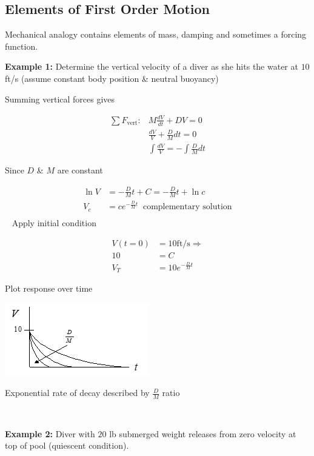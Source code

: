 \documentclass[
]{book}
\begin{document}
\hypertarget{elements-of-first-order-motion}{%
\subsection{Elements of First Order Motion}\label{elements-of-first-order-motion}}

Mechanical analogy contains elements of mass, damping and sometimes a forcing function.

\textbf{Example 1:} Determine the vertical velocity of a diver as she hits the water at \(10\) ft/s (assume constant body position \& neutral buoyancy)

Summing vertical forces gives

\[ 
\begin{align}
\sum F_{\mathrm{vert}} : &M \frac{dV}{dt} + DV = 0 \\
&\frac{dV}{V} + \frac{D}{M} dt = 0 \\
&\int{}{} \frac{dV}{V} = -\int{}{} \frac{D}{M} dt
\end{align}
\]

Since \(D\) \& \(M\) are constant

\[ 
\begin{align}
\ln V &= -\frac{D}{M} t + C =  -\frac{D}{M} t + \ln c\\
V_c &= c e^{-\frac{D}{M} t} \;\;\text{complementary solution}\\
\end{align}
\]
~
Apply initial condition

\[ 
\begin{align}
V(t=0) &= 10 \mathrm{ft/s} \Rightarrow \\
10 &= C \\
V_T &= 10 e^{-\frac{D}{M} t}
\end{align}
\]

Plot response over time

\includegraphics{media/08/image5.png}

Exponential rate of decay described by \(\frac{D}{M}\) ratio

~

\textbf{Example 2:} Diver with \(20\) lb submerged weight releases from zero velocity at top of pool (quiescent condition).
\end{document}
